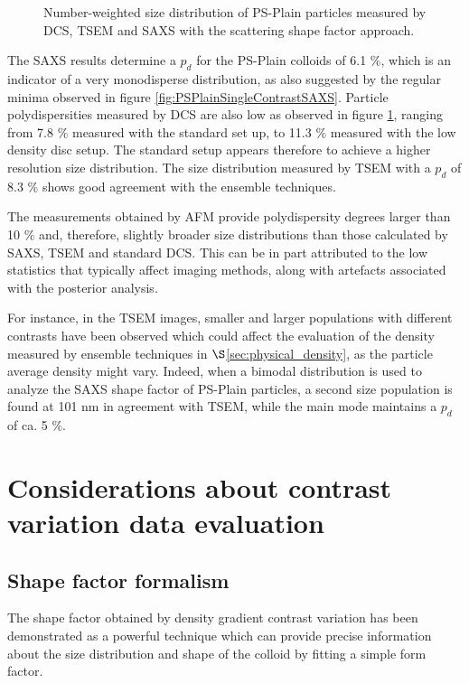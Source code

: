 \begin{figure}
	\begin{center}
		
	\end{center}
	\caption{Number-weighted size distribution of PS-Plain particles measured by DCS, TSEM \citep{nicolet_inter-laboratory_2016} and SAXS with the scattering shape factor approach.}
	\label{fig:PSPlainSizeDistribution}
\end{figure}

The SAXS results determine a $p_d$ for the PS-Plain colloids of 6.1 $\%$, which is an indicator of a very monodisperse distribution, as also suggested by the regular minima observed in figure \ref{fig:PSPlainSingleContrastSAXS}. Particle polydispersities measured by DCS are also low as observed in figure \ref{fig:PSPlainSizeDistribution}, ranging from 7.8 $\%$ measured with the standard set up, to 11.3 $\%$ measured with the low density disc setup. The standard setup appears therefore to achieve a higher resolution size distribution. The size distribution measured by TSEM with a $p_d$ of 8.3 $\%$ shows good agreement with the ensemble techniques.

The measurements obtained by AFM provide polydispersity degrees larger than 10 $\%$\citep{nicolet_inter-laboratory_2016} and, therefore, slightly broader size distributions than those calculated by SAXS, TSEM and standard DCS. This can be in part attributed to the low statistics that typically affect imaging methods, along with artefacts associated with the posterior analysis.

For instance, in the TSEM images\citep{nicolet_inter-laboratory_2016}, smaller and larger populations with different contrasts have been observed which could affect the evaluation of the density measured by ensemble techniques in $\S$\ref{sec:physical_density}, as the particle average density might vary. Indeed, when a bimodal distribution is used to analyze the SAXS shape factor of PS-Plain particles, a second size population is found at 101 nm in agreement with TSEM, while the main mode maintains a $p_d$ of ca. 5 $\%$.

\section{Considerations about contrast variation data evaluation}
\subsection{Shape factor formalism}
The shape factor obtained by density gradient contrast variation has been demonstrated as a powerful technique which can provide precise information about the size distribution and shape of the colloid by fitting a simple form factor.

